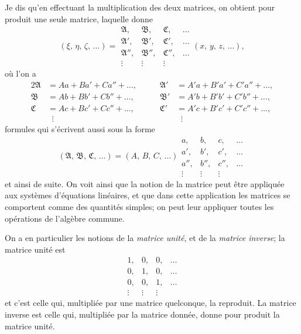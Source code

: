 \documentclass[11pt,a4paper]{book}
\begin{document}
Je dis qu'en effectuant la multiplication des deux matrices, on obtient
pour produit une seule matrice, laquelle donne
\[
(\xi,\, \eta,\, \zeta,\, \ldots) =
\begin{array}{|cccc|}
\mathfrak{A}, & \mathfrak{B}, & \mathfrak{C}, & \ldots \\
\mathfrak{A}', & \mathfrak{B}', & \mathfrak{C}', & \ldots \\
\mathfrak{A}'', & \mathfrak{B}'', & \mathfrak{C}'', & \ldots \\
\vdots & \vdots & \vdots &
\end{array}
(x,\, y,\, z,\, \ldots),
\]
o\`u l'on a
\begin{alignat*}{2}
\mathfrak{A} &= Aa + Ba' + Ca'' + \ldots,\qquad
& \mathfrak{A}' &= A'a + B'a' + C'a'' + \ldots, \\
\mathfrak{B} &= Ab + Bb' + Cb'' + \ldots,\qquad
& \mathfrak{B}' &= A'b + B'b' + C'b'' + \ldots, \\
\mathfrak{C} &= Ac + Bc' + Cc'' + \ldots,\qquad
& \mathfrak{C}' &= A'c + B'c' + C'c'' + \ldots, \\
& \;\;\vdots & & \;\;\vdots
\end{alignat*}
formules qui s'\'ecrivent aussi sous la forme
\[
(\mathfrak{A},\, \mathfrak{B},\, \mathfrak{C},\, \ldots)
= (A,\, B,\, C,\, \ldots)
\!
\begin{array}{|cccc|}
a, & b, & c, & \ldots \\
a', & b', & c', & \ldots \\
a'', & b'', & c'', & \ldots \\
\vdots & \vdots & \vdots &
\end{array}
\]
et ainsi de suite. On voit ainsi que la notion de la matrice peut \^etre
appliqu\'ee aux syst\`emes d'\'equations lin\'eaires, et que dans cette
application les matrices se comportent comme des quantit\'es simples; on
peut leur appliquer toutes les op\'erations de l'alg\`ebre commune.

\medskip

On a en particulier les notions de la \textit{matrice unit\'e}, et de la
\textit{matrice inverse}; la matrice unit\'e est
\[
\begin{array}{|cccc|}
1, & 0, & 0, & \ldots \\
0, & 1, & 0, & \ldots \\
0, & 0, & 1, & \ldots \\
\vdots & \vdots & \vdots &
\end{array}
\]
et c'est celle qui, multipli\'ee par une matrice quelconque, la reproduit.
La matrice inverse est celle qui, multipli\'ee par la matrice donn\'ee,
donne pour produit la matrice unit\'e.
\end{document}
